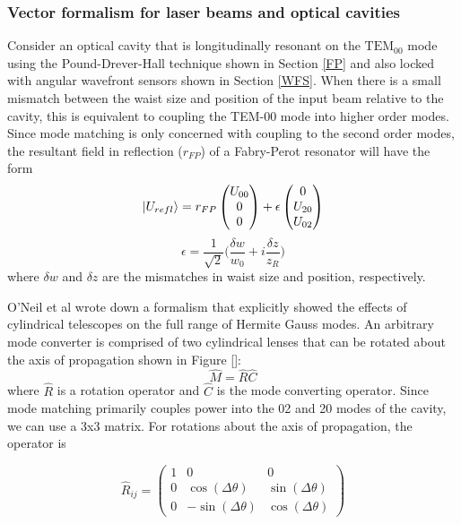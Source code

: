 \subsubsection{Vector formalism for laser beams and optical cavities}
Consider an optical cavity that is longitudinally resonant on the $\text{TEM}_{00}$ mode using the Pound-Drever-Hall technique shown in Section \ref{FP} and also locked with angular wavefront sensors shown in Section \ref{WFS}. When there is a small mismatch between the waist size and position of the input beam relative to the cavity, this is equivalent to coupling the TEM-00 mode into higher order modes.  Since mode matching is only concerned with coupling to the second order modes, the  resultant field in reflection ($r_{FP}$) of a Fabry-Perot resonator will have the form
	\begin{equation}\label{MMVector}
\ket{U_{refl}} = r_{FP} \begin{pmatrix} U_{00}
\\ 0
\\ 0
\end{pmatrix}
+
\epsilon \begin{pmatrix} 0
\\ U_{20}
\\ U_{02}
\end{pmatrix}
\end{equation}
\begin{equation}
\epsilon = \frac{1}{\sqrt{2}} \bigg(\frac{\delta w}{w_0} + i \frac{\delta z}{z_R}\bigg)
\end{equation}
where $\delta w$ and $\delta z$ are the mismatches in waist size and position, respectively.  

O'Neil et al \cite{ONeilModeTransform} wrote down a formalism that explicitly showed the effects of cylindrical telescopes on the full range of Hermite Gauss modes. An arbitrary mode converter is comprised of two cylindrical lenses that can be rotated about the axis of propagation shown in Figure []:
	\begin{equation}
	\hat{M} = \hat{R} \hat{C}
	\end{equation} 
where $\hat{R}$ is a rotation operator and $\hat{C}$ is the mode converting operator.  Since mode matching primarily couples power into the 02 and 20 modes of the cavity, we can use a 3x3 matrix.  For rotations about the axis of propagation, the operator is

\begin{equation} \label{rotation}
\hat{R}_{ij} = 
\begin{pmatrix}
1		&0										& 0 
\\ 	0		&\cos(\Delta \theta)						&\sin(\Delta \theta)
\\ 	0		&-\sin(\Delta \theta)						&\cos(\Delta \theta)			

\end{pmatrix}
\end{equation}

